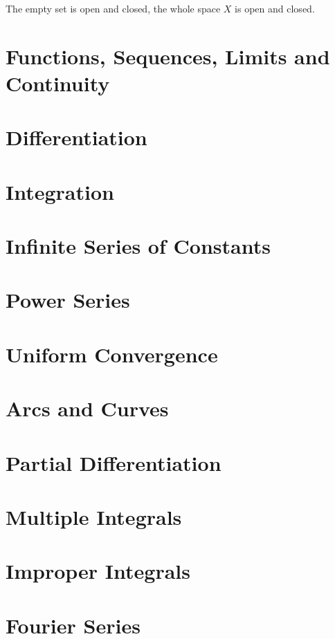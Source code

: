 				\begin{remark}
					The empty set is open and closed, the whole space $X$ is open and closed.
				\end{remark}

			\section{Functions, Sequences, Limits and Continuity}

			\section{Differentiation}

			\section{Integration}

			\section{Infinite Series of Constants}

			\section{Power Series}

			\section{Uniform Convergence}

			\section{Arcs and Curves}

			\section{Partial Differentiation}

			\section{Multiple Integrals}

			\section{Improper Integrals}

			\section{Fourier Series}

